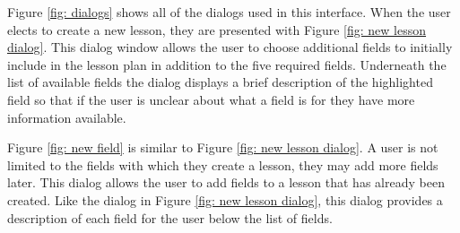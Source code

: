 \documentclass[10pt,letter]{article}
\begin{document}
Figure \ref{fig: dialogs} shows all of the dialogs used in this interface. When
the user elects to create a new lesson, they are presented with Figure
\ref{fig: new lesson dialog}. This dialog window allows the user to choose
additional fields to initially include in the lesson plan in addition to the
five required fields. Underneath the list of available fields the dialog
displays a brief description of the highlighted field so that if the user is
unclear about what a field is for they have more information available.

Figure \ref{fig: new field} is similar to Figure \ref{fig: new lesson dialog}. A
user is not limited to the fields with which they create a lesson, they may add
more fields later. This dialog allows the user to add fields to a lesson that
has already been created. Like the dialog in Figure \ref{fig: new lesson dialog},
this dialog provides a description of each field for the user below the list of
fields.
\end{document}
